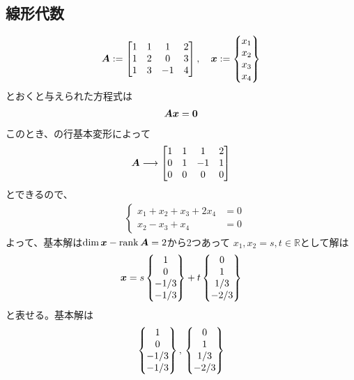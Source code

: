\subsection{線形代数}
\begin{ans*}
  \begin{gather}
    \bm{A} := \begin{bmatrix}
      1 & 1 & 1 & 2 \\
      1 & 2 & 0 & 3 \\
      1 & 3 & -1 & 4
    \end{bmatrix},\quad {\bm{x}} := \begin{Bmatrix}
      x_1 \\ x_2 \\ x_3 \\ x_4
    \end{Bmatrix}
  \end{gather}
  とおくと与えられた方程式は
  \begin{align}
    \bm{A} {\bm{x}} = \bm{0}
  \end{align}
  このとき、\bA の行基本変形によって
  \begin{gather}
    \bm{A} \longrightarrow
    \begin{bmatrix}
      1& 1& 1& 2 \\
      0& 1& -1& 1 \\
      0& 0& 0& 0 \\
    \end{bmatrix}
  \end{gather}
  とできるので、
  \begin{align}
    &\left\{
    \begin{aligned}
      x_1 + x_2 + x_3 + 2x_4 &= 0 \\
      x_2 - x_3 + x_4 &= 0
    \end{aligned}
    \right.
  \end{align}
  よって、基本解は$\dim{\bm{x}} - \operatorname{rank}\bm{A} = 2$から2つあって
  $x_1,x_2 = s,t \in \mathbb{R}$として解は
  \begin{align}
    {\bm{x}} = s
    \begin{Bmatrix}
      1 \\ 0 \\ -1/3 \\ -1/3
    \end{Bmatrix}
    + t
    \begin{Bmatrix}
      0 \\ 1 \\ 1/3 \\ -2/3
    \end{Bmatrix}
  \end{align}
  と表せる。基本解は
  \begin{align}
    \begin{Bmatrix}
      1 \\ 0 \\ -1/3 \\ -1/3
    \end{Bmatrix},\,
    \begin{Bmatrix}
      0 \\ 1 \\ 1/3 \\ -2/3
    \end{Bmatrix}
  \end{align}
\end{ans*}


